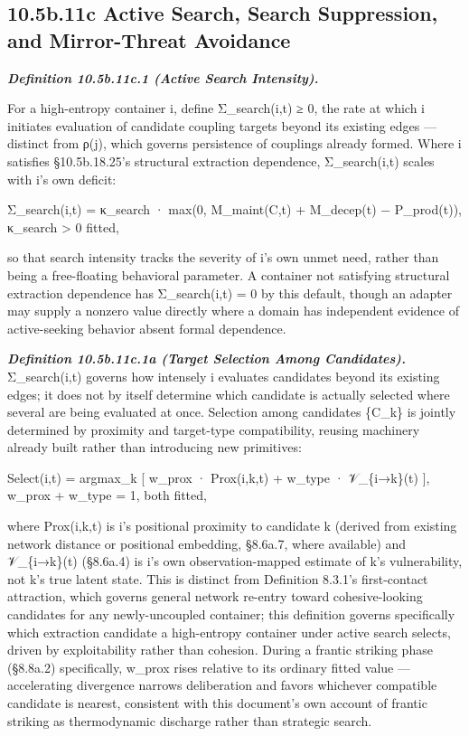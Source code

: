 \documentclass[
]{article}
\begin{document}
\hypertarget{b.11c-active-search-search-suppression-and-mirror-threat-avoidance}{%
\subsection{10.5b.11c Active Search, Search Suppression, and
Mirror-Threat
Avoidance}\label{b.11c-active-search-search-suppression-and-mirror-threat-avoidance}}

\emph{\textbf{Definition 10.5b.11c.1 (Active Search Intensity).}}

For a high-entropy container i, define Σ\_search(i,t) ≥ 0, the rate at
which i initiates evaluation of candidate coupling targets beyond its
existing edges --- distinct from ρ(j), which governs persistence of
couplings already formed. Where i satisfies §10.5b.18.25's structural
extraction dependence, Σ\_search(i,t) scales with i's own deficit:

Σ\_search(i,t) = κ\_search · max(0, M\_maint(C,t) + M\_decep(t) −
P\_prod(t)), κ\_search \textgreater{} 0 fitted,

so that search intensity tracks the severity of i's own unmet need,
rather than being a free-floating behavioral parameter. A container not
satisfying structural extraction dependence has Σ\_search(i,t) = 0 by
this default, though an adapter may supply a nonzero value directly
where a domain has independent evidence of active-seeking behavior
absent formal dependence.

\emph{\textbf{Definition 10.5b.11c.1a (Target Selection Among
Candidates).}} Σ\_search(i,t) governs how intensely i evaluates
candidates beyond its existing edges; it does not by itself determine
which candidate is actually selected where several are being evaluated
at once. Selection among candidates \{C\_k\} is jointly determined by
proximity and target-type compatibility, reusing machinery already built
rather than introducing new primitives:

Select(i,t) = argmax\_k {[} w\_prox · Prox(i,k,t) + w\_type ·
𝒱\_\{i→k\}(t) {]}, w\_prox + w\_type = 1, both fitted,

where Prox(i,k,t) is i's positional proximity to candidate k (derived
from existing network distance or positional embedding, §8.6a.7, where
available) and 𝒱\_\{i→k\}(t) (§8.6a.4) is i's own observation-mapped
estimate of k's vulnerability, not k's true latent state. This is
distinct from Definition 8.3.1's first-contact attraction, which governs
general network re-entry toward cohesive-looking candidates for any
newly-uncoupled container; this definition governs specifically which
extraction candidate a high-entropy container under active search
selects, driven by exploitability rather than cohesion. During a frantic
striking phase (§8.8a.2) specifically, w\_prox rises relative to its
ordinary fitted value --- accelerating divergence narrows deliberation
and favors whichever compatible candidate is nearest, consistent with
this document's own account of frantic striking as thermodynamic
discharge rather than strategic search.
\end{document}

